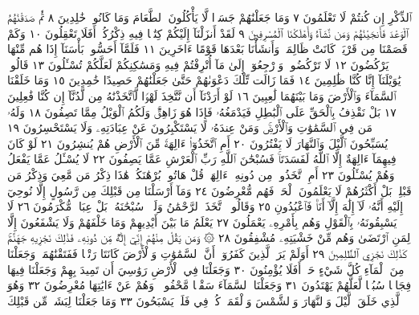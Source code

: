 ٱلذِّكْرِ إِن كُنتُمْ لَا تَعْلَمُونَ ٧ وَمَا جَعَلْنَٰهُمْ جَسَدࣰا
لَّا يَأْكُلُونَ ٱلطَّعَامَ وَمَا كَانُوا۟ خَٰلِدِينَ ٨ ثُمَّ صَدَقْنَٰهُمُ
ٱلْوَعْدَ فَأَنجَيْنَٰهُمْ وَمَن نَّشَآءُ وَأَهْلَكْنَا ٱلْمُسْرِفِينَ ٩
لَقَدْ أَنزَلْنَآ إِلَيْكُمْ كِتَٰبࣰا فِيهِ ذِكْرُكُمْۚ أَفَلَا تَعْقِلُونَ ١٠
وَكَمْ قَصَمْنَا مِن قَرْيَةࣲ كَانَتْ ظَالِمَةࣰ وَأَنشَأْنَا بَعْدَهَا قَوْمًا
ءَاخَرِينَ ١١ فَلَمَّآ أَحَسُّوا۟ بَأْسَنَآ إِذَا هُم مِّنْهَا يَرْكُضُونَ ١٢
لَا تَرْكُضُوا۟ وَٱرْجِعُوٓا۟ إِلَىٰ مَآ أُتْرِفْتُمْ فِيهِ وَمَسَٰكِنِكُمْ لَعَلَّكُمْ
تُسْـَٔلُونَ ١٣ قَالُوا۟ يَٰوَيْلَنَآ إِنَّا كُنَّا ظَٰلِمِينَ ١٤ فَمَا زَالَت تِّلْكَ
دَعْوَىٰهُمْ حَتَّىٰ جَعَلْنَٰهُمْ حَصِيدًا خَٰمِدِينَ ١٥ وَمَا خَلَقْنَا
ٱلسَّمَآءَ وَٱلْأَرْضَ وَمَا بَيْنَهُمَا لَٰعِبِينَ ١٦ لَوْ أَرَدْنَآ أَن نَّتَّخِذَ
لَهْوࣰا لَّٱتَّخَذْنَٰهُ مِن لَّدُنَّآ إِن كُنَّا فَٰعِلِينَ ١٧ بَلْ نَقْذِفُ بِٱلْحَقِّ عَلَى
ٱلْبَٰطِلِ فَيَدْمَغُهُۥ فَإِذَا هُوَ زَاهِقࣱۚ وَلَكُمُ ٱلْوَيْلُ مِمَّا تَصِفُونَ ١٨
وَلَهُۥ مَن فِي ٱلسَّمَٰوَٰتِ وَٱلْأَرْضِۚ وَمَنْ عِندَهُۥ لَا يَسْتَكْبِرُونَ
عَنْ عِبَادَتِهِۦ وَلَا يَسْتَحْسِرُونَ ١٩ يُسَبِّحُونَ ٱلَّيْلَ وَٱلنَّهَارَ
لَا يَفْتُرُونَ ٢٠ أَمِ ٱتَّخَذُوٓا۟ ءَالِهَةࣰ مِّنَ ٱلْأَرْضِ هُمْ يُنشِرُونَ ٢١
لَوْ كَانَ فِيهِمَآ ءَالِهَةٌ إِلَّا ٱللَّهُ لَفَسَدَتَاۚ فَسُبْحَٰنَ ٱللَّهِ رَبِّ ٱلْعَرْشِ
عَمَّا يَصِفُونَ ٢٢ لَا يُسْـَٔلُ عَمَّا يَفْعَلُ وَهُمْ يُسْـَٔلُونَ ٢٣ أَمِ ٱتَّخَذُوا۟
مِن دُونِهِۦٓ ءَالِهَةࣰۖ قُلْ هَاتُوا۟ بُرْهَٰنَكُمْۖ هَٰذَا ذِكْرُ مَن مَّعِيَ وَذِكْرُ
مَن قَبْلِيۚ بَلْ أَكْثَرُهُمْ لَا يَعْلَمُونَ ٱلْحَقَّۖ فَهُم مُّعْرِضُونَ ٢٤
وَمَآ أَرْسَلْنَا مِن قَبْلِكَ مِن رَّسُولٍ إِلَّا نُوحِيٓ إِلَيْهِ أَنَّهُۥ لَآ إِلَٰهَ
إِلَّآ أَنَا۠ فَٱعْبُدُونِ ٢٥ وَقَالُوا۟ ٱتَّخَذَ ٱلرَّحْمَٰنُ وَلَدࣰاۗ سُبْحَٰنَهُۥۚ
بَلْ عِبَادࣱ مُّكْرَمُونَ ٢٦ لَا يَسْبِقُونَهُۥ بِٱلْقَوْلِ وَهُم
بِأَمْرِهِۦ يَعْمَلُونَ ٢٧ يَعْلَمُ مَا بَيْنَ أَيْدِيهِمْ وَمَا خَلْفَهُمْ
وَلَا يَشْفَعُونَ إِلَّا لِمَنِ ٱرْتَضَىٰ وَهُم مِّنْ خَشْيَتِهِۦ مُشْفِقُونَ ٢٨
۞ وَمَن يَقُلْ مِنْهُمْ إِنِّيٓ إِلَٰهࣱ مِّن دُونِهِۦ فَذَٰلِكَ نَجْزِيهِ
جَهَنَّمَۚ كَذَٰلِكَ نَجْزِي ٱلظَّٰلِمِينَ ٢٩ أَوَلَمْ يَرَ ٱلَّذِينَ كَفَرُوٓا۟
أَنَّ ٱلسَّمَٰوَٰتِ وَٱلْأَرْضَ كَانَتَا رَتْقࣰا فَفَتَقْنَٰهُمَاۖ وَجَعَلْنَا
مِنَ ٱلْمَآءِ كُلَّ شَيْءٍ حَيٍّۚ أَفَلَا يُؤْمِنُونَ ٣٠ وَجَعَلْنَا فِي ٱلْأَرْضِ
رَوَٰسِيَ أَن تَمِيدَ بِهِمْ وَجَعَلْنَا فِيهَا فِجَاجࣰا سُبُلࣰا لَّعَلَّهُمْ
يَهْتَدُونَ ٣١ وَجَعَلْنَا ٱلسَّمَآءَ سَقْفࣰا مَّحْفُوظࣰاۖ وَهُمْ عَنْ
ءَايَٰتِهَا مُعْرِضُونَ ٣٢ وَهُوَ ٱلَّذِي خَلَقَ ٱلَّيْلَ وَٱلنَّهَارَ وَٱلشَّمْسَ
وَٱلْقَمَرَۖ كُلࣱّ فِي فَلَكࣲ يَسْبَحُونَ ٣٣ وَمَا جَعَلْنَا لِبَشَرࣲ مِّن قَبْلِكَ
